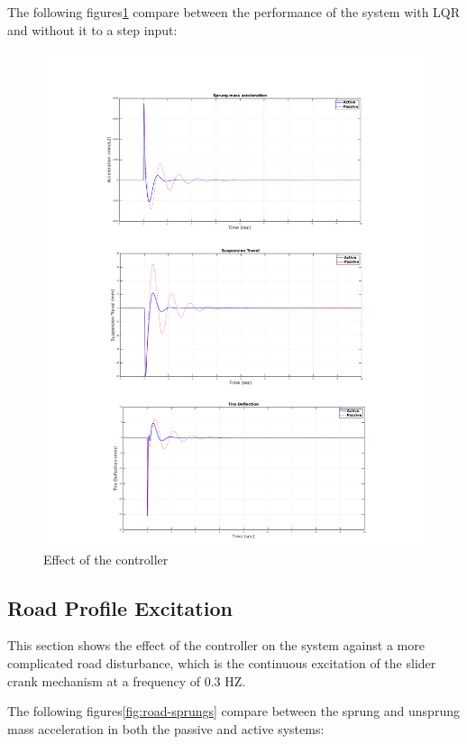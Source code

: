 \newpage
The following figures\ref{fig:all-step} compare between the performance of the system with LQR and without it to a step input: 
\begin{figure}[H]
	\centering
	\includegraphics[trim=0cm 2cm 0cm 2cm, clip, width=1\linewidth]{figures/p-a-step.pdf}
	\caption{Effect of the controller}
	\label{fig:all-step}
\end{figure}

\newpage
\subsection{Road Profile Excitation}
This section shows the effect of the controller on the system against a more complicated road disturbance, which is the continuous excitation of the slider crank mechanism at a frequency of 0.3 HZ.

The following figures\ref{fig:road-sprungs} compare between the sprung and unsprung mass acceleration in both the passive and active systems:

